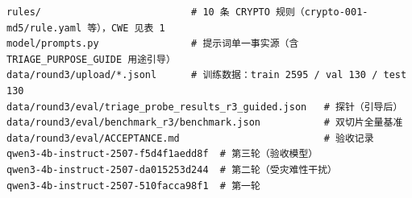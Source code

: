 \documentclass[11pt,a4paper,fontset=none]{ctexart}
\begin{document}
\begin{lstlisting}[language={},breaklines=true]
rules/                          # 10 条 CRYPTO 规则（crypto-001-md5/rule.yaml 等），CWE 见表 1
model/prompts.py                # 提示词单一事实源（含 TRIAGE_PURPOSE_GUIDE 用途引导）
data/round3/upload/*.jsonl      # 训练数据：train 2595 / val 130 / test 130
data/round3/eval/triage_probe_results_r3_guided.json   # 探针（引导后）
data/round3/eval/benchmark_r3/benchmark.json           # 双切片全量基准
data/round3/eval/ACCEPTANCE.md                         # 验收记录
qwen3-4b-instruct-2507-f5d4f1aedd8f  # 第三轮（验收模型）
qwen3-4b-instruct-2507-da015253d244  # 第二轮（受灾难性干扰）
qwen3-4b-instruct-2507-510facca98f1  # 第一轮
\end{lstlisting}
\end{document}
